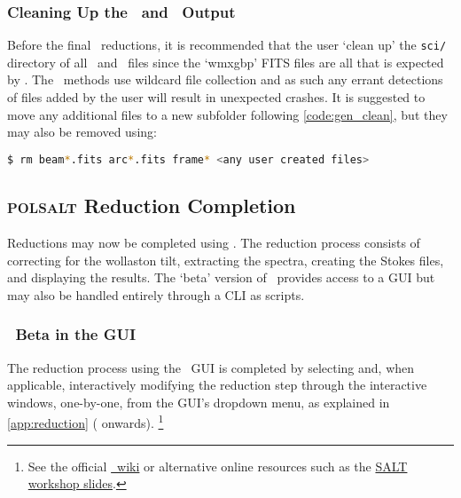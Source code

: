 \subsubsection{Cleaning Up the \iraf\ and \stops\ Output}

Before the final \polsalt\ reductions, it is recommended that the user `clean up' the \texttt{sci/} directory of all \iraf\ and \stops\ files since the `wmxgbp' \gls{FITS} files are all that is expected by \polsalt. The \polsalt\ methods use wildcard file collection and as such any errant detections of files added by the user will result in unexpected crashes. It is suggested to move any additional files to a new subfolder following \autoref{code:gen_clean}, but they may also be removed using:
\begin{lstlisting}[language=bash]
$ rm beam*.fits arc*.fits frame* <any user created files>
\end{lstlisting}

\subsection{\textsc{polsalt} Reduction Completion} \label{subsec:reduc_com}

Reductions may now be completed using \polsalt. The reduction process consists of correcting for the wollaston tilt, extracting the spectra, creating the Stokes files, and displaying the results. The `beta' version of \polsalt\ provides access to a \gls{GUI} but may also be handled entirely through a \gls{CLI} as scripts.

\subsubsection{\polsalt\ Beta in the \gls{GUI}}

The reduction process using the \polsalt\ \gls{GUI} is completed by selecting and, when applicable, interactively modifying the reduction step through the interactive windows, one-by-one, from the \gls{GUI}'s dropdown menu, as explained in \autoref{app:reduction} ( onwards).%
\footnote{See the official \href{https://github.com/saltastro/polsalt/wiki}{\polsalt\ wiki} or alternative online resources such as the \href{https://saltworkshop2022.salt.ac.za/wp-content/uploads/2022/11/DG_polsalt_SALT_workshop_2022_finalversion.pdf}{\gls{SALT} workshop slides}.}


